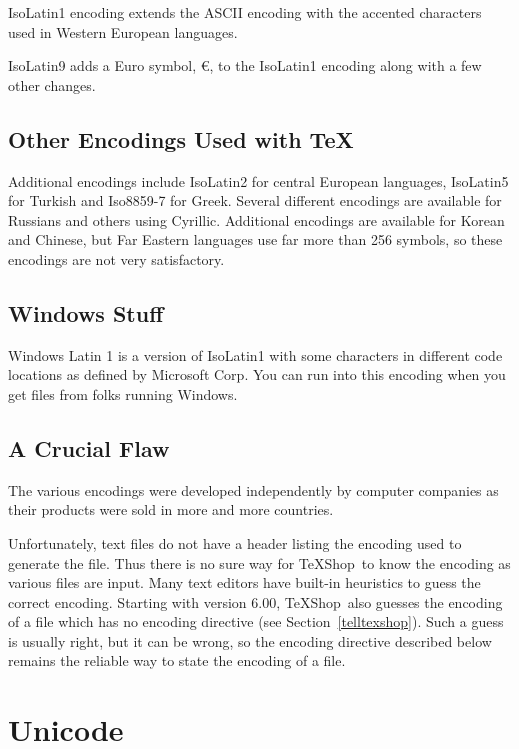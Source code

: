 \documentclass[letterpaper,11pt]{article}
\newcommand{\TS}{\textsf{\TeX Shop}}
\newcommand{\acr}[1]{\textsf{#1}}
\begin{document}
\acr{IsoLatin1} encoding extends the \acr{ASCII} encoding with the accented characters used in Western European languages.

\acr{IsoLatin9} adds a Euro symbol, €, to the \acr{IsoLatin1} encoding along with a few other changes.

\subsection{Other Encodings Used with \TeX}

Additional encodings include \acr{IsoLatin2} for central European languages, \acr{IsoLatin5} for 
\acr{Turkish} and \acr{Iso8859-7} for Greek. Several different encodings are available for Russians and others using Cyrillic. Additional encodings are available for Korean and Chinese, but Far Eastern languages use far more than 256 symbols, so these encodings are not very satisfactory.

\subsection{Windows Stuff}

\acr{Windows Latin 1} is a version of \acr{IsoLatin1} with some characters in different code locations as defined by Microsoft Corp. You can run into this encoding when you get files from folks running Windows.

\subsection{A Crucial Flaw}
The various encodings were developed independently by  computer companies as
their products were sold in more and more countries. 

Unfortunately, text files do not have a header listing the encoding used to generate the
file. Thus there is no sure way for \TS\ to know the encoding as various files are input. 
Many text editors have built-in heuristics to guess the correct encoding. Starting with version 6.00, \TS\ also guesses the encoding of a file which has no encoding directive (see Section~\ref{telltexshop}). Such a guess is usually right, but it can be wrong, so the encoding directive described below remains the reliable way to state the encoding of a file.

\section{\acr{Unicode}}
\end{document}
